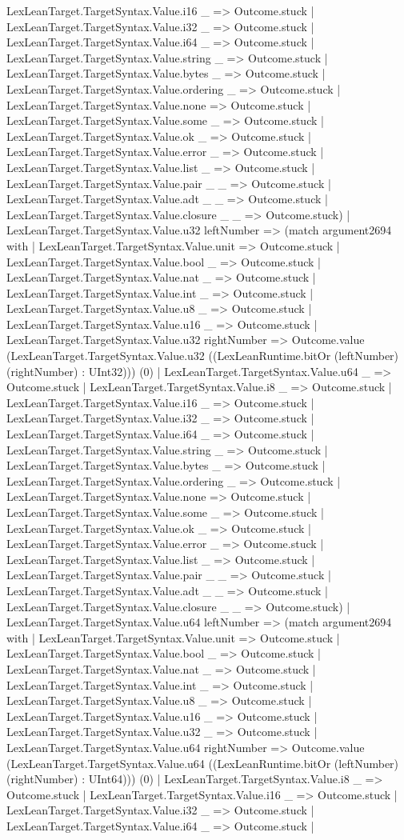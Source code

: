 \documentclass[11pt]{article}
\begin{document}
LexLeanTarget.TargetSyntax.Value.i16 \_ => Outcome.stuck | LexLeanTarget.TargetSyntax.Value.i32 \_ => Outcome.stuck | LexLeanTarget.TargetSyntax.Value.i64 \_ => Outcome.stuck | LexLeanTarget.TargetSyntax.Value.string \_ => Outcome.stuck | LexLeanTarget.TargetSyntax.Value.bytes \_ => Outcome.stuck | LexLeanTarget.TargetSyntax.Value.ordering \_ => Outcome.stuck | LexLeanTarget.TargetSyntax.Value.none => Outcome.stuck | LexLeanTarget.TargetSyntax.Value.some \_ => Outcome.stuck | LexLeanTarget.TargetSyntax.Value.ok \_ => Outcome.stuck | LexLeanTarget.TargetSyntax.Value.error \_ => Outcome.stuck | LexLeanTarget.TargetSyntax.Value.list \_ => Outcome.stuck | LexLeanTarget.TargetSyntax.Value.pair \_ \_ => Outcome.stuck | LexLeanTarget.TargetSyntax.Value.adt \_ \_ => Outcome.stuck | LexLeanTarget.TargetSyntax.Value.closure \_ \_ => Outcome.stuck) | LexLeanTarget.TargetSyntax.Value.u32 leftNumber => (match argument2694 with | LexLeanTarget.TargetSyntax.Value.unit => Outcome.stuck | LexLeanTarget.TargetSyntax.Value.bool \_ => Outcome.stuck | LexLeanTarget.TargetSyntax.Value.nat \_ => Outcome.stuck | LexLeanTarget.TargetSyntax.Value.int \_ => Outcome.stuck | LexLeanTarget.TargetSyntax.Value.u8 \_ => Outcome.stuck | LexLeanTarget.TargetSyntax.Value.u16 \_ => Outcome.stuck | LexLeanTarget.TargetSyntax.Value.u32 rightNumber => Outcome.value (LexLeanTarget.TargetSyntax.Value.u32 ((LexLeanRuntime.bitOr (leftNumber) (rightNumber) : UInt32))) (0) | LexLeanTarget.TargetSyntax.Value.u64 \_ => Outcome.stuck | LexLeanTarget.TargetSyntax.Value.i8 \_ => Outcome.stuck | LexLeanTarget.TargetSyntax.Value.i16 \_ => Outcome.stuck | LexLeanTarget.TargetSyntax.Value.i32 \_ => Outcome.stuck | LexLeanTarget.TargetSyntax.Value.i64 \_ => Outcome.stuck | LexLeanTarget.TargetSyntax.Value.string \_ => Outcome.stuck | LexLeanTarget.TargetSyntax.Value.bytes \_ => Outcome.stuck | LexLeanTarget.TargetSyntax.Value.ordering \_ => Outcome.stuck | LexLeanTarget.TargetSyntax.Value.none => Outcome.stuck | LexLeanTarget.TargetSyntax.Value.some \_ => Outcome.stuck | LexLeanTarget.TargetSyntax.Value.ok \_ => Outcome.stuck | LexLeanTarget.TargetSyntax.Value.error \_ => Outcome.stuck | LexLeanTarget.TargetSyntax.Value.list \_ => Outcome.stuck | LexLeanTarget.TargetSyntax.Value.pair \_ \_ => Outcome.stuck | LexLeanTarget.TargetSyntax.Value.adt \_ \_ => Outcome.stuck | LexLeanTarget.TargetSyntax.Value.closure \_ \_ => Outcome.stuck) | LexLeanTarget.TargetSyntax.Value.u64 leftNumber => (match argument2694 with | LexLeanTarget.TargetSyntax.Value.unit => Outcome.stuck | LexLeanTarget.TargetSyntax.Value.bool \_ => Outcome.stuck | LexLeanTarget.TargetSyntax.Value.nat \_ => Outcome.stuck | LexLeanTarget.TargetSyntax.Value.int \_ => Outcome.stuck | LexLeanTarget.TargetSyntax.Value.u8 \_ => Outcome.stuck | LexLeanTarget.TargetSyntax.Value.u16 \_ => Outcome.stuck | LexLeanTarget.TargetSyntax.Value.u32 \_ => Outcome.stuck | LexLeanTarget.TargetSyntax.Value.u64 rightNumber => Outcome.value (LexLeanTarget.TargetSyntax.Value.u64 ((LexLeanRuntime.bitOr (leftNumber) (rightNumber) : UInt64))) (0) | LexLeanTarget.TargetSyntax.Value.i8 \_ => Outcome.stuck | LexLeanTarget.TargetSyntax.Value.i16 \_ => Outcome.stuck | LexLeanTarget.TargetSyntax.Value.i32 \_ => Outcome.stuck | LexLeanTarget.TargetSyntax.Value.i64 \_ => Outcome.stuck | 
\end{document}
